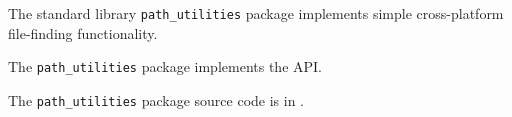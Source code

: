 
The standard library {\tt path\_utilities} package implements simple cross-platform file-finding functionality.

The {\tt path\_utilities} package implements the  API.

The {\tt path\_utilities} package source code is in .


